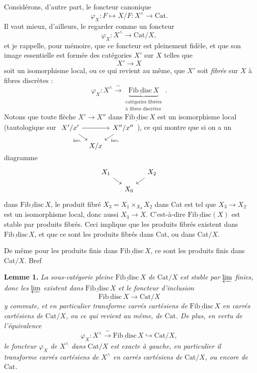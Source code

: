 \documentclass[11pt]{article}
\newcommand{\printedpage}[1]{\marginpar{\footnotesize p.~#1}}
\newcommand{\msp}[1]{\marginpar{\footnotesize [#1]}}
\newcommand{\Cat}{\mathrm{Cat}}
\newcommand{\Fibdisc}{\underline{\mathrm{Fib\ disc}}}
\begin{document}
Considérons, d'autre part, le foncteur canonique
\[
\varphi_X : F \longmapsto X/F : X^{\wedge} \longrightarrow \mathrm{Cat}.
\]
Il vaut mieux, d'ailleurs, le regarder comme un foncteur
\[
\varphi_X : X^{\wedge} \longrightarrow \mathrm{Cat}/X,
\]
et je rappelle, pour mémoire, que ce foncteur est pleinement fidèle, et que son image essentielle est formée des catégories $X'$ sur $X$ telles que
\[
X' \longrightarrow X
\]
\msp{page 163}
soit un isomorphisme local, ou ce qui revient au même, que $X'$ soit \textit{fibrée} sur $X$ à fibres discrètes :
\[
\varphi_X : X^{\wedge} \xrightarrow{\ \sim\ } \underbrace{\Fibdisc\, X}_{\substack{\text{catégories fibrées}\\ \text{à fibres discrètes}}} \ .
\]
Notons que toute flèche $X' \longrightarrow X''$ dans $\Fibdisc\, X$ est un isomorphisme local (tautologique sur $\begin{tikzcd}[ampersand replacement=\&, row sep=small, column sep=tiny, baseline=(\tikzcdmatrixname-1-1.base)] X'/x' \ar[rr] \ar[dr, "\text{iso.}"'] \& \& X''/x'' \ar[dl, "\text{iso.}"] \\ \& X/x \& \end{tikzcd}$), ce qui montre que si on a un diagramme
\[
\begin{tikzcd}[row sep=small, column sep=small]
X_1 \ar[dr] & & X_2 \ar[dl] \\
& X_0 &
\end{tikzcd}
\]
dans $\Fibdisc\, X$, le produit fibré $X_3 = X_1 \times_{X_0} X_2$ dans Cat est tel que $X_3 \longrightarrow X_2$ est un isomorphisme local, donc aussi $X_3 \longrightarrow X$. C'est-à-dire $\Fibdisc(X)$ est stable par produits fibrés. Ceci implique que les produits fibrés existent dans $\Fibdisc\, X$, et que ce sont les produits fibrés dans Cat, ou dans Cat$/X$.

\printedpage{112}
\msp{page 164}
De même pour les produits finis dans $\Fibdisc\, X$, ce sont les produits finis dans Cat$/X$. Bref

\textbf{Lemme 1.} \textit{La sous-catégorie pleine} $\Fibdisc\, X$ \textit{de} $\Cat/X$ \textit{est stable par} $\varprojlim$ \textit{finies, donc les} $\varprojlim$ \textit{existent dans} $\Fibdisc\, X$ \textit{et le foncteur d'inclusion}
\[
\Fibdisc\, X \longrightarrow \Cat/X
\]
\textit{y commute, et en particulier transforme carrés cartésiens de} $\Fibdisc\, X$ \textit{en carrés cartésiens de} $\Cat/X$\textit{, ou ce qui revient au même, de} $\Cat$\textit{. De plus, en vertu de l'équivalence}
\[
\varphi_X : X^{\wedge} \xrightarrow{\ \sim\ } \Fibdisc\, X \hookrightarrow \Cat/X,
\]
\textit{le foncteur $\varphi_X$ de $X^{\wedge}$ dans} $\Cat/X$ \textit{est exacte à gauche, en particulier il transforme carrés cartésiens de $X^{\wedge}$ en carrés cartésiens de} $\Cat/X$\textit{, ou encore de} $\Cat$\textit{.} %
\end{document}

